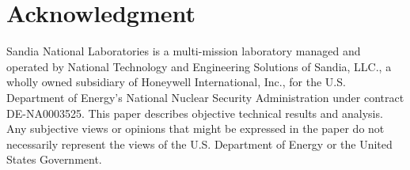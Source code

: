 \documentclass[11pt, letterpaper]{article}
\begin{document}
\section*{Acknowledgment}
Sandia National Laboratories is a multi-mission laboratory managed and operated by National Technology and Engineering Solutions of Sandia, LLC., a wholly owned subsidiary of Honeywell International, Inc., for the U.S. Department of Energy's National Nuclear Security Administration under contract DE-NA0003525.
This paper describes objective technical results and analysis.
Any subjective views or opinions that might be expressed in the paper do not necessarily represent the views of the U.S. Department of Energy or the United States Government.






\end{document}
